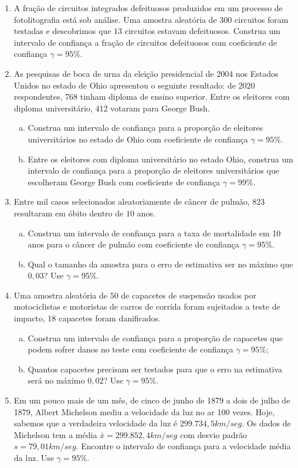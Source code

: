 \documentclass[12pt, a4paper]{article}
\begin{document}
\begin{enumerate}
	\item A fração de circuitos integrados defeituosos produzidos  em um processo de fotolitografia está sob análise. Uma amostra aleatória de $300$ circuitos foram testadas e descobrimos que $13$ circuitos estavam defeituosos. Construa um intervalo de confiança a fração de circuitos defeituosos com coeficiente de confiança $\gamma=95\%$.
	
	\item As pesquisas de boca de urna da eleição presidencial de 2004 nos Estados Unidos no estado de Ohio apresentou o seguinte resultado: de 2020 respondentes, 768 tinham diploma de ensino superior. Entre os eleitores com diploma universitário, 412 votaram para George Bush.
	\begin{enumerate}[(a)]
		\item Construa um intervalo de confiança para a proporção de eleitores universitários no estado de Ohio com coeficiente de confiança $\gamma=95\%$.
		\item Entre os eleitores com diploma universitário no estado Ohio, construa um intervalo de confiança para a proporção de eleitores universitários que escolheram George Bush com coeficiente de confiança $\gamma=99\%$. 
	\end{enumerate}
	
	\item Entre mil casos selecionados aleatoriamente de câncer de pulmão, 823 resultaram em óbito dentro de $10$ anos. 
	\begin{enumerate}[(a)]
		\item Construa um intervalo de confiança para a taxa de mortalidade em 10 anos para o câncer de pulmão com coeficiente de confiança $\gamma=95\%$.
		\item Qual o tamanho da amostra para o erro de estimativa ser no máximo que $0,03$? Use $\gamma = 95\%$.
	\end{enumerate}
	
	\item Uma amostra aleatória de $50$ de capacetes de suspensão usados por motociclistas e motoristas de carros de corrida foram sujeitados a teste de impacto, 18 capacetes foram danificados.
	\begin{enumerate}[(a)]
		\item Construa um intervalo de confiança para a proporção de capacetes que podem sofrer danos no teste com coeficiente de confiança $\gamma=95\%$;
		\item Quantos capacetes precisam ser testados para que o erro na estimativa será no máximo $0,02$? Use $\gamma=95\%$.
	\end{enumerate}

	\item Em um pouco mais de um mês, de cinco de junho de 1879 a dois de julho de 1879, Albert Michelson mediu a velocidade da luz no ar 100 vezes. Hoje, sabemos que a verdadeira velocidade da luz é $299.734,5 km/seg$. Os dados de Michelson tem a média $\bar{x} = 299.852,4 km/seg$ com desvio padrão $s = 79,01 km/seg$. Encontre o intervalo de confiança para a velocidade média da luz. Use $\gamma= 95\%$.
	
\end{enumerate}
\end{document}
